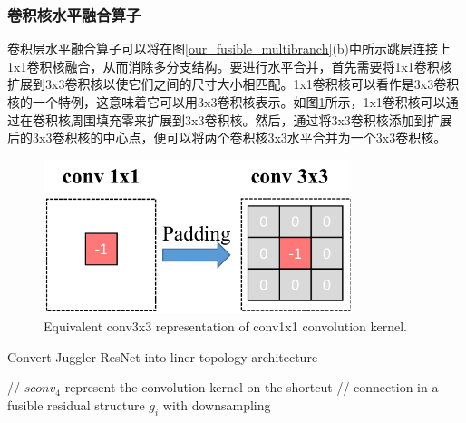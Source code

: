 \subsubsection{卷积核水平融合算子}
\label{sub3}
卷积层水平融合算子可以将在图\ref{our_fusible_multibranch}(b)中所示跳层连接上1x1卷积核融合，从而消除多分支结构。要进行水平合并，首先需要将1x1卷积核扩展到3x3卷积核以使它们之间的尺寸大小相匹配。1x1卷积核可以看作是3x3卷积核的一个特例，这意味着它可以用3x3卷积核表示。如图\ref{conv1_expand}所示，1x1卷积核可以通过在卷积核周围填充零来扩展到3x3卷积核。然后，通过将3x3卷积核添加到扩展后的3x3卷积核的中心点，便可以将两个卷积核3x3水平合并为一个3x3卷积核。

\begin{figure}[h]
	\centering
	\includegraphics[width=0.8\textwidth]{figures/Jresnet/FIG6_TII-21-2604.pdf}
	\caption{Equivalent conv3x3 representation of conv1x1 convolution kernel.}
	\label{conv1_expand}
\end{figure}


\begin{algorithm}[H]
	\caption{Convert Juggler-ResNet into liner-topology architecture}
	\label{alm11}
	
	\BlankLine
	// $sconv_{4}$ represent the convolution kernel on the shortcut\; 
	// connection in a fusible residual structure $ g_{i}$ with downsampling\;
	
\end{algorithm}

